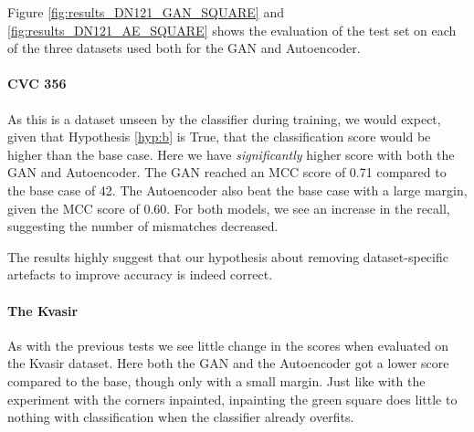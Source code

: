 \noindent Figure \ref{fig:results_DN121_GAN_SQUARE} and \ref{fig:results_DN121_AE_SQUARE} shows the evaluation of the test set on each of the three datasets used both for the GAN and Autoencoder. 

\paragraph{CVC 356}
As this is a dataset unseen by the classifier during training, we would expect, given that Hypothesis \ref{hyp:b} is True, that the classification score would be higher than the base case.
Here we have \textit{significantly} higher score with both the GAN and Autoencoder. 
The GAN reached an MCC score of 0.71 compared to the base case of 42. The Autoencoder also beat the base case with a large margin, given the MCC score of 0.60. 
For both models, we see an increase in the recall, suggesting the number of mismatches decreased.

The results highly suggest that our hypothesis about removing dataset-specific artefacts to improve accuracy is indeed correct. 

\paragraph{The Kvasir}
As with the previous tests we see little change in the scores when evaluated on the Kvasir dataset.
Here both the GAN and the Autoencoder got a lower score compared to the base, though only with a small margin. Just like with the experiment with the corners inpainted, inpainting the green square does little to nothing with classification when the classifier already overfits.


